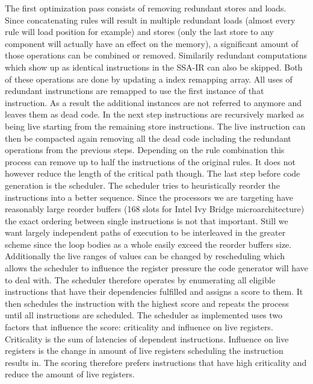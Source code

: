 The first optimization pass consists of removing redundant stores and loads. Since concatenating rules will result in multiple redundant loads (almost every rule will load position for example) and stores (only the last store to any component will actually have an effect on the memory), a significant amount of those operations can be combined or removed. Similarily redundant computations which show up as identical instructions in the SSA-IR can also be skipped. Both of these operations are done by updating a index remapping array. All uses of redundant instrunctions are remapped to use the first instance of that instruction. As a result the additional instances are not referred to anymore and leaves them as dead code.
In the next step instructions are recursively marked as being live starting from the remaining store instructions. The live instruction can then be compacted again removing all the dead code including the redundant operations from the previous steps. Depending on the rule combination this process can remove up to half the instructions of the original rules. It does not however reduce the length of the critical path though.
The last step before code generation is the scheduler. The scheduler tries to heuristically reorder the instructions into a better sequence. Since the processors we are targeting have reasonably large reorder buffers (168 slots for Intel Ivy Bridge microarchitecture) the exact ordering between single instructions is not that important. Still we want largely independent paths of execution to be interleaved in the greater scheme since the loop bodies as a whole easily exceed the reorder buffers size. Additionally the live ranges of values can be changed by rescheduling which allows the scheduler to influence the register pressure the code generator will have to deal with.
The scheduler therefore operates by enumerating all eligible instructions that have their dependencies fulfilled and assigns a score to them. It then schedules the instruction with the highest score and repeats the process until all instructions are scheduled. The scheduler as implemented uses two factors that influence the score: criticality and influence on live registers. Criticality is the sum of latencies of dependent instructions. Influence on live registers is the change in amount of live registers scheduling the instruction results in. The scoring therefore prefers instructions that have high criticality and reduce the amount of live registers.

